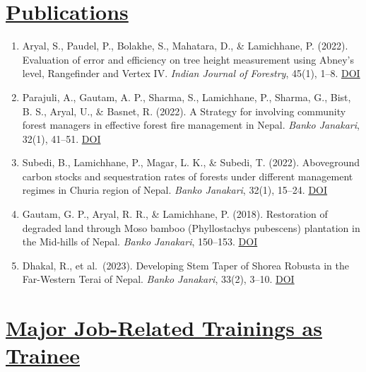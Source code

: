 \documentclass[
]{article}
\providecommand{\tightlist}{%
  \setlength{\itemsep}{0pt}\setlength{\parskip}{0pt}}
\begin{document}
\section{\texorpdfstring{\underline{Publications}}{}}\label{section-3}

\begin{enumerate}
\def\labelenumi{\arabic{enumi}.}
\tightlist
\item
  Aryal, S., Paudel, P., Bolakhe, S., Mahatara, D., \& Lamichhane, P.
  (2022). Evaluation of error and efficiency on tree height measurement
  using Abney's level, Rangefinder and Vertex IV. \emph{Indian Journal
  of Forestry}, 45(1), 1--8.
  \href{https://doi.org/10.54207/bsmps1000-2022-49P4F8}{DOI}
\item
  Parajuli, A., Gautam, A. P., Sharma, S., Lamichhane, P., Sharma, G.,
  Bist, B. S., Aryal, U., \& Basnet, R. (2022). A Strategy for involving
  community forest managers in effective forest fire management in
  Nepal. \emph{Banko Janakari}, 32(1), 41--51.
  \href{https://doi.org/10.3126/banko.v32i1.45476}{DOI}
\item
  Subedi, B., Lamichhane, P., Magar, L. K., \& Subedi, T. (2022).
  Aboveground carbon stocks and sequestration rates of forests under
  different management regimes in Churia region of Nepal. \emph{Banko
  Janakari}, 32(1), 15--24.
  \href{https://doi.org/10.3126/banko.v32i1.45442}{DOI}
\item
  Gautam, G. P., Aryal, R. R., \& Lamichhane, P. (2018). Restoration of
  degraded land through Moso bamboo (Phyllostachys pubescens) plantation
  in the Mid-hills of Nepal. \emph{Banko Janakari}, 150--153.
  \href{https://doi.org/10.3126/banko.v27i3.20560}{DOI}
\item
  Dhakal, R., et al.~(2023). Developing Stem Taper of Shorea Robusta in
  the Far-Western Terai of Nepal. \emph{Banko Janakari}, 33(2), 3--10.
  \href{https://doi.org/10.3126/banko.v33i2.58809}{DOI}
\end{enumerate}

\section{\texorpdfstring{\underline{Major Job-Related Trainings as Trainee}}{}}\label{section-4}
\end{document}
